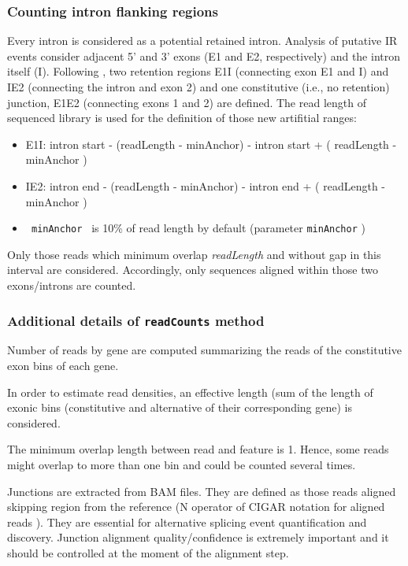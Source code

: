 \documentclass{article}
\begin{document}
\subsubsection{Counting intron flanking regions }
\label{sec:intronFlanking}

Every intron is considered as a potential retained intron. Analysis of putative
IR events consider adjacent 5' and 3' exons (E1 and E2, respectively) and the
intron itself (I). Following \cite{ pmid25258385 }, two retention regions E1I 
(connecting exon E1 and I) and IE2 (connecting the intron and exon 2) and one
constitutive (i.e., no retention) junction, E1E2 (connecting exons 1 and 2) are
defined. The read length of sequenced library is used for the definition of 
those new artifitial ranges:

\begin{itemize}
  \item E1I: intron start - (readLength - minAnchor) - intron start + (
  readLength - minAnchor )
  \item IE2: intron end - (readLength - minAnchor) - intron end + ( readLength -
  minAnchor )
  \item \texttt{ minAnchor } is 10\% of read length by default (parameter
  \texttt{minAnchor} )
\end{itemize}

Only those reads which minimum overlap \textit{readLength} and without gap in 
this interval are considered. Accordingly, only sequences aligned within those 
two exons/introns are counted.

\subsubsection{Additional details of \texttt{readCounts} method }

Number of reads by gene are computed summarizing the reads of the constitutive 
exon bins of each gene.

In order to estimate read densities, an effective length (sum of the length of 
exonic bins (constitutive and alternative of their corresponding gene) is
considered.

The minimum overlap length between read and feature is 1. Hence, some reads
might overlap to more than one bin  and could be counted several times.

Junctions are extracted from BAM files. They are defined as those reads
aligned skipping region from the reference (N operator of CIGAR notation
for aligned reads \cite{pmid19505943} ). They are essential for alternative
splicing event quantification and discovery. Junction alignment
quality/confidence is extremely important and it should be controlled at the
moment of the alignment step.
\end{document}
